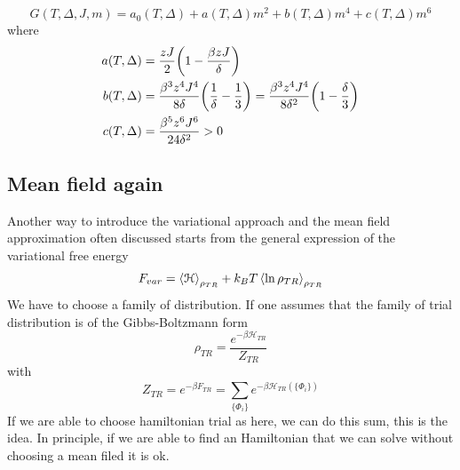 \documentclass[../main/main.tex]{subfiles}
\begin{document}
\begin{exercise}
\begin{equation}
  G (T, \Delta , J, m) = a_0 (T,\Delta ) + a(T, \Delta )m^2 + b (T, \Delta ) m^4 + c(T, \Delta )m^6
\end{equation}
where
\begin{subequations}
\begin{align}
  a(T,\Delta ) &= \frac{z J}{2} \qty(1 - \frac{\beta z J}{\delta })   \\
  b(T,\Delta ) &= \frac{\beta ^3 z^4 J^4}{8 \delta } \qty(\frac{1}{\delta } - \frac{1}{3}) = \frac{\beta ^3 z^4 J^4}{8 \delta^2 } \qty(1 - \frac{\delta }{3})    \\
  c(T,\Delta ) &= \frac{\beta ^5 z^6 J^6}{24 \delta^2 } > 0
\end{align}
\end{subequations}

\end{exercise}


\subsection{Mean field again}
Another way to introduce the variational approach and the mean field approximation often discussed starts from the general expression of the variational free energy
\begin{equation}
  F_{var} = \expval{\mathcal{H}}_{\rho _{TR}} + k_B T \expval{\ln{\rho _{TR}} }_{\rho _{TR}}
\end{equation}
We have to choose a family of distribution.
If one assumes that the family of trial distribution is of the Gibbs-Boltzmann form
\begin{equation}
  \rho _{TR} = \frac{e^{- \beta \mathcal{H}_{TR}} }{Z_{TR}}
\end{equation}
with
\begin{equation}
  Z_{TR} = e^{-\beta F_{TR}} = \sum_{\{ \Phi _i \}  }^{} e^{-\beta \mathcal{H}_{TR} ( \{ \Phi _i \}  )}
\end{equation}
If we are able to choose hamiltonian trial as here, we can do this sum, this is the idea. In principle, if we are able to find an Hamiltonian that we can solve without choosing a mean filed it is ok.
\end{document}

